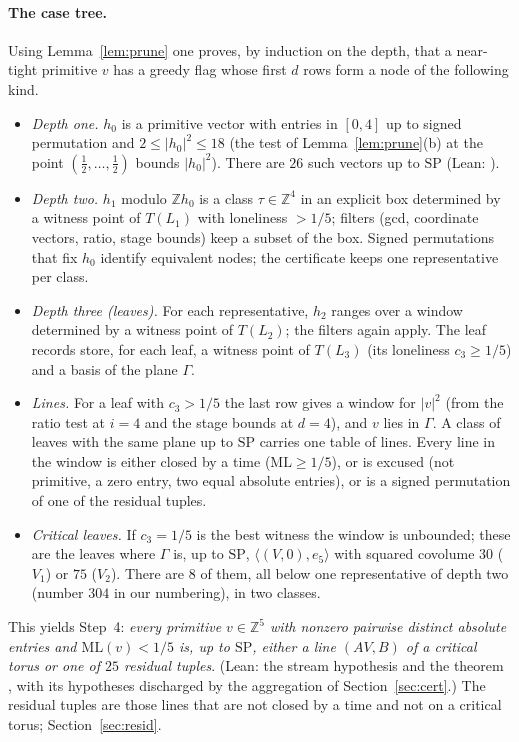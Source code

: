 \documentclass[11pt]{article}
\theoremstyle{remark}
\newcommand{\ML}{\mathrm{ML}}
\newcommand{\Z}{\mathbb{Z}}
\begin{document}
\paragraph{The case tree.} Using Lemma~\ref{lem:prune} one proves, by induction on the depth, that a near-tight primitive $v$ has a greedy flag whose first $d$ rows form a node of the following kind.
\begin{itemize}
\item \emph{Depth one.} $h_0$ is a primitive vector with entries in $[0,4]$ up to signed permutation and $2\le|h_0|^2\le18$ (the test of Lemma~\ref{lem:prune}(b) at the point $(\tfrac12,\dots,\tfrac12)$ bounds $|h_0|^2$). There are $26$ such vectors up to $\mathrm{SP}$ (Lean: ).
\item \emph{Depth two.} $h_1$ modulo $\Z h_0$ is a class $\tau\in\Z^4$ in an explicit box determined by a witness point of $T(L_1)$ with loneliness $>1/5$; filters (gcd, coordinate vectors, ratio, stage bounds) keep a subset of the box. Signed permutations that fix $h_0$ identify equivalent nodes; the certificate keeps one representative per class.
\item \emph{Depth three (leaves).} For each representative, $h_2$ ranges over a window determined by a witness point of $T(L_2)$; the filters again apply. The leaf records store, for each leaf, a witness point of $T(L_3)$ (its loneliness $c_3\ge1/5$) and a basis of the plane $\Gamma$.
\item \emph{Lines.} For a leaf with $c_3>1/5$ the last row gives a window for $|v|^2$ (from the ratio test at $i=4$ and the stage bounds at $d=4$), and $v$ lies in $\Gamma$. A class of leaves with the same plane up to $\mathrm{SP}$ carries one table of lines. Every line in the window is either closed by a time ($\ML\ge1/5$), or is excused (not primitive, a zero entry, two equal absolute entries), or is a signed permutation of one of the residual tuples.
\item \emph{Critical leaves.} If $c_3=1/5$ is the best witness the window is unbounded; these are the leaves where $\Gamma$ is, up to $\mathrm{SP}$, $\langle(V,0),e_5\rangle$ with squared covolume $30$ ($V_1$) or $75$ ($V_2$). There are $8$ of them, all below one representative of depth two (number $304$ in our numbering), in two classes.
\end{itemize}
This yields Step~4: \emph{every primitive $v\in\Z^5$ with nonzero pairwise distinct absolute entries and $\ML(v)<1/5$ is, up to $\mathrm{SP}$, either a line $(AV,B)$ of a critical torus or one of $25$ residual tuples}. (Lean: the stream hypothesis  and the theorem , with its hypotheses discharged by the aggregation of Section~\ref{sec:cert}.) The residual tuples are those lines that are not closed by a time and not on a critical torus; Section~\ref{sec:resid}.
\end{document}
